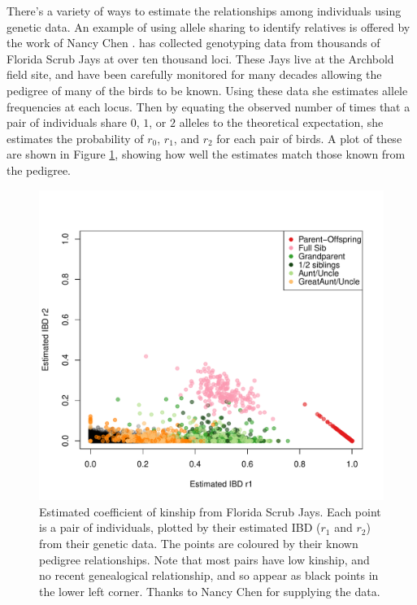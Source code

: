{{There's a variety of ways to estimate the relationships among
individuals using genetic data.  An example of using allele sharing to identify relatives is offered by
the work of Nancy Chen \citep[in collaboration with Stepfanie
Aguillon, see ][]{chen:16,Aguillon:17}. \citeauthor{chen:16} has collected genotyping data from thousands of
Florida Scrub Jays at over ten thousand loci. These Jays live at the
Archbold field site, and have been carefully monitored for many
decades allowing the pedigree of many of the birds to be known.
Using these data she estimates allele frequencies at each
locus. Then by equating the observed number of times that a pair of
individuals share $0$, $1$, or $2$ alleles to the theoretical
expectation, she estimates the probability of $r_0$, $r_1$, and
$r_2$ for each pair of birds. A plot of these are shown in Figure
\ref{fig:FSJ_IBD}, showing how well the estimates match those known
from the pedigree.


\begin{figure}
\begin{center}
\includegraphics[width= 0.75 \textwidth]{figures/FSJ_IBD.pdf}
\end{center}
\caption[3cm]{Estimated coefficient
of kinship from Florida Scrub Jays. Each point is a pair of
individuals, plotted by their estimated IBD ($r_1$ and $r_2$) from their genetic data. The
points are coloured by their known pedigree relationships. Note that
most pairs have low kinship, and no recent genealogical relationship,
and so appear as black points in the lower left corner. Thanks to
Nancy Chen for supplying the data.  } \label{fig:FSJ_IBD}
\end{figure}

}}
